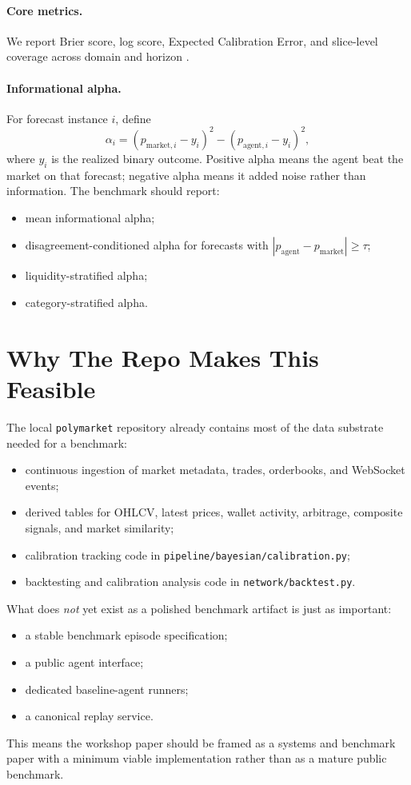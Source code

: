 \documentclass[10pt]{article}
\begin{document}
\paragraph{Core metrics.}
We report Brier score, log score, Expected Calibration Error, and slice-level
coverage across domain and horizon \citep{brier1950verification}.

\paragraph{Informational alpha.}
For forecast instance $i$, define
\[
\alpha_i = (p_{\text{market},i} - y_i)^2 - (p_{\text{agent},i} - y_i)^2,
\]
where $y_i$ is the realized binary outcome. Positive alpha means the agent beat
the market on that forecast; negative alpha means it added noise rather than
information. The benchmark should report:
\begin{itemize}[leftmargin=1.5em,itemsep=0.2em]
  \item mean informational alpha;
  \item disagreement-conditioned alpha for forecasts with
  $|p_{\text{agent}} - p_{\text{market}}| \ge \tau$;
  \item liquidity-stratified alpha;
  \item category-stratified alpha.
\end{itemize}

\section{Why The Repo Makes This Feasible}

The local \texttt{polymarket} repository already contains most of the data
substrate needed for a benchmark:
\begin{itemize}[leftmargin=1.5em,itemsep=0.2em]
  \item continuous ingestion of market metadata, trades, orderbooks, and
  WebSocket events;
  \item derived tables for OHLCV, latest prices, wallet activity, arbitrage,
  composite signals, and market similarity;
  \item calibration tracking code in
  \texttt{pipeline/bayesian/calibration.py};
  \item backtesting and calibration analysis code in
  \texttt{network/backtest.py}.
\end{itemize}

What does \emph{not} yet exist as a polished benchmark artifact is just as
important:
\begin{itemize}[leftmargin=1.5em,itemsep=0.2em]
  \item a stable benchmark episode specification;
  \item a public agent interface;
  \item dedicated baseline-agent runners;
  \item a canonical replay service.
\end{itemize}
This means the workshop paper should be framed as a systems and benchmark paper
with a minimum viable implementation rather than as a mature public benchmark.
\end{document}
